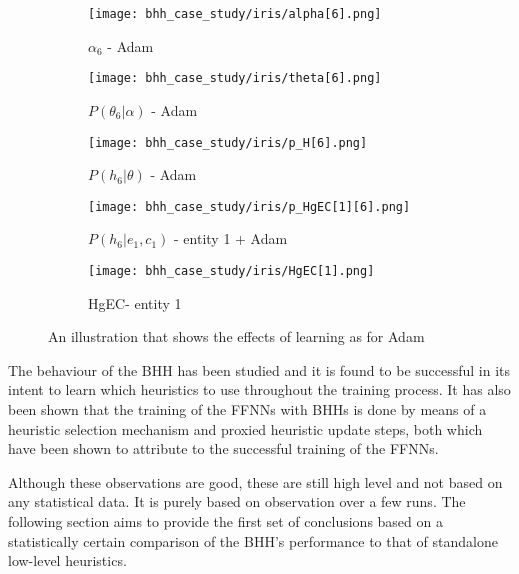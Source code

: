 \begin{figure}[htbp]
	\begin{subfigure}{0.5\textwidth}
		\centering
		\texttt{[image: bhh\_case\_study/iris/alpha[6].png]}
		\caption{$\alpha_{6}$ - \Acs{Adam}}
		\label{fig:results:case_study:iris:adam:alpha:6}
	\end{subfigure}
	\begin{subfigure}{0.5\textwidth}
		\centering
		\texttt{[image: bhh\_case\_study/iris/theta[6].png]}
		\caption{$P(\theta_{6} | \alpha)$ - \Acs{Adam}}
		\label{fig:results:case_study:iris:adam:p_theta:6}
	\end{subfigure}
	\par\bigskip
	\begin{subfigure}{0.5\textwidth}
		\centering
		\texttt{[image: bhh\_case\_study/iris/p\_H[6].png]}
		\caption{$P\left(h_{6} | \theta \right)$ - \Acs{Adam}}
		\label{fig:results:case_study:iris:adam:p_H:6}
	\end{subfigure}
	\begin{subfigure}{0.5\textwidth}
		\centering
		\texttt{[image: bhh\_case\_study/iris/p\_HgEC[1][6].png]}
		\caption{$P\left(h_{6}|e_{1},c_{1}\right)$ - entity 1 + \Acs{Adam} }
		\label{fig:results:case_study:iris:adam:p_HgEC:1:6}
	\end{subfigure}
	\par\bigskip
	\begin{subfigure}{\textwidth}
		\centering
		\texttt{[image: bhh\_case\_study/iris/HgEC[1].png]}
		\caption{HgEC\rbrack - entity 1}
		\label{fig:results:case_study:iris:adam:HgEC:1}
	\end{subfigure}
	\par\bigskip
	\caption{An illustration that shows the effects of learning as for \Acs{Adam}}
	\label{fig:results:case_study:iris:adam:HgEC}
\end{figure}


The behaviour of the \Ac{BHH} has been studied and it is found to be successful in its intent to learn which heuristics to use throughout the training process. It has also been shown that the training of the \acp{FFNN} with \Acp{BHH} is done by means of a heuristic selection mechanism and proxied heuristic update steps, both which have been shown to attribute to the successful training of the \acp{FFNN}.

Although these observations are good, these are still high level and not based on any statistical data. It is purely based on observation over a few runs. The following section aims to provide the first set of conclusions based on a statistically certain comparison of the \Ac{BHH}'s performance to that of standalone low-level heuristics.


